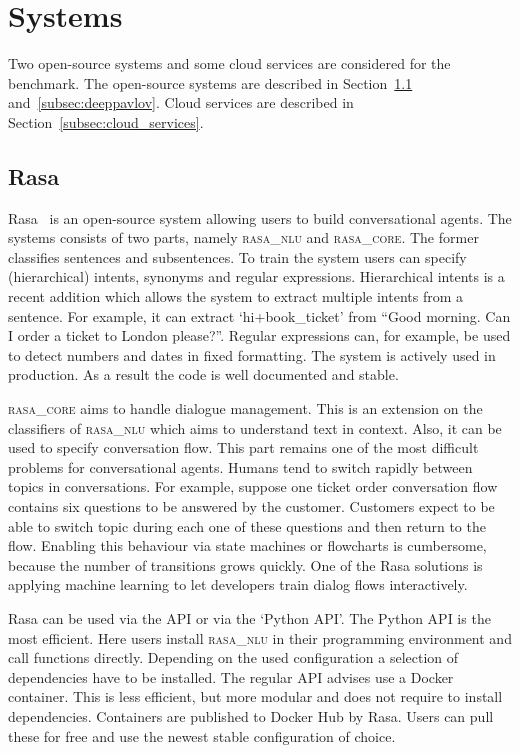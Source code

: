 \section{Systems}
\label{sec:systems}

Two open-source systems and some cloud services are considered for the benchmark.
The open-source systems are described in Section~\ref{subsec:rasa} and~\ref{subsec:deeppavlov}.
Cloud services are described in Section~\ref{subsec:cloud_services}.

\subsection{Rasa}
\label{subsec:rasa}
Rasa~\citep{bocklisch2017rasa} is an open-source system allowing users to build conversational agents.
The systems consists of two parts, namely \textsc{rasa\_nlu} and \textsc{rasa\_core}.
The former classifies sentences and subsentences.
To train the system users can specify (hierarchical) intents, synonyms and regular expressions.
Hierarchical intents is a recent addition which allows the system to extract multiple intents from a sentence.
For example, it can extract `hi+book\_ticket' from
``Good morning.
Can I order a ticket to London please?''.
Regular expressions can, for example, be used to detect numbers and dates in fixed formatting.
The system is actively used in production.
As a result the code is well documented and stable.

\textsc{rasa\_core} aims to handle dialogue management.
This is an extension on the classifiers of \textsc{rasa\_nlu} which aims to understand text in context.
Also, it can be used to specify conversation flow.
This part remains one of the most difficult problems for conversational agents.
Humans tend to switch rapidly between topics in conversations.
For example, suppose one ticket order conversation flow contains six questions to be answered by the customer.
Customers expect to be able to switch topic during each one of these questions and then return to the flow.
Enabling this behaviour via state machines or flowcharts is cumbersome, because the number of transitions grows quickly.
One of the Rasa solutions is applying machine learning to let developers train dialog flows interactively.

Rasa can be used via the API or via the `Python API'.
The Python API is the most efficient.
Here users install \textsc{rasa\_nlu} in their programming environment and call functions directly.
Depending on the used configuration a selection of dependencies have to be installed.
The regular API advises use a Docker container.
This is less efficient, but more modular and does not require to install dependencies.
Containers are published to Docker Hub by Rasa.
Users can pull these for free and use the newest stable configuration of choice.

